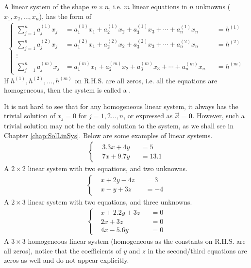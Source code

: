 \begin{defn}
\label{defn:linsys}
A linear system of the shape $m \times n$, i.e. $m$ linear equations in $n$ unknowns ($x_1, x_2, \ldots, x_n$), has the form of
\begin{align}
\label{eqn:linsys}
\left\{\begin{alignedat}{2}
\sum_{j=1}^n a_j^{(1)}x_j &= a_1^{(1)}x_1 + a_2^{(1)}x_2 + a_3^{(1)}x_3 + \cdots + a_n^{(1)}x_n & &= h^{(1)} \\
\sum_{j=1}^n a_j^{(2)}x_j &= a_1^{(2)}x_1 + a_2^{(2)}x_2 + a_3^{(2)}x_3 + \cdots + a_n^{(2)}x_n & &= h^{(2)} \\
\vdots \\
\sum_{j=1}^n a_j^{(m)}x_j &= a_1^{(m)}x_1 + a_2^{(m)}x_2 + a_3^{(m)}x_3 + \cdots + a_n^{(m)}x_n & &= h^{(m)} 
\end{alignedat}\right.
\end{align}
If $h^{(1)}, h^{(2)}, \ldots, h^{(m)}$ on R.H.S. are all zeros, i.e. all the equations are homogeneous, then the system is called a .
\end{defn}
It is not hard to see that for any homogeneous linear system, it always has the trivial solution of $x_j = 0$ for $j = 1, 2 \ldots, n$, or expressed as $\vec{x} = \textbf{0}$. However, such a trivial solution may not be the only solution to the system, as we shall see in Chapter \ref{chap:SolLinSys}. Below are some examples of linear systems.
\begin{align*}
\left\{\begin{alignedat}{2}
&3.3x + 4y& &= 5 \\
&7x + 9.7y& &= 13.1
\end{alignedat}\right.
\end{align*}
A $2 \times 2$ linear system with two equations, and two unknowns.
\begin{align}
\label{eqn:linsys1}
\left\{\begin{alignedat}{2}
&x + 2y - 4z& &= 3 \\
&x - y + 3z& &= -4
\end{alignedat}\right.
\end{align}
A $2 \times 3$ linear system with two equations, and three unknowns.
\begin{align}
\label{eqn:linsys2}
\left\{\begin{alignedat}{2}
&x + 2.2y + 3z& &= 0 \\
&2x + 3z& &= 0 \\
&4x - 5.6y& &= 0
\end{alignedat}\right.
\end{align}
A $3 \times 3$ homogeneous linear system (homogeneous as the constants on R.H.S. are all zeros), notice that the coefficients of $y$ and $z$ in the second/third equations are zeros as well and do not appear explicitly.\par

